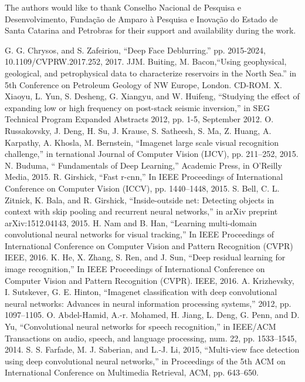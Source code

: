 \documentclass[conference]{IEEEtran}
\begin{document}
The authors would like to thank Conselho
Nacional de Pesquisa e Desenvolvimento, Fundação de
Amparo à Pesquisa e Inovação do Estado de Santa Catarina
and Petrobras for their support and availability during the work.

\begin{thebibliography}{00}

		G. G. Chrysos, and S. Zafeiriou, ``Deep Face Deblurring.'' pp. 2015-2024, 10.1109/CVPRW.2017.252, 2017. 
 		JJM. Buiting, M. Bacon,``Using geophysical, geological, and petrophysical data to characterize reservoirs in the North Sea.'' in 5th Conference on Petroleum Geology of NW Europe, London. CD-ROM.
  		X. Xiaoyu, L. Yun, S. Desheng, G. Xiangyu, and W. Huifeng, ``Studying the effect of expanding low or high frequency on post-stack seismic inversion,'' in SEG Technical Program Expanded Abstracts 2012, pp. 1-5, September 2012.
		O. Russakovsky, J. Deng, H. Su, J. Krause, S. Satheesh, S. Ma, Z. Huang, A. Karpathy, A. Khosla, M. Bernstein, ``Imagenet large scale visual recognition challenge,'' in ternational Journal of Computer Vision (IJCV), pp. 211–252, 2015.
  		N. Buduma, `` Fundamentals of Deep Learning,'' Academic Press, in O'Reilly Media, 2015.
		R. Girshick, ``Fast r-cnn,'' In IEEE Proceedings of International Conference on Computer Vision (ICCV), pp. 1440–1448, 2015.
		S. Bell, C. L. Zitnick, K. Bala, and R. Girshick, ``Inside-outside net: Detecting objects in context with skip pooling and recurrent neural networks,'' in arXiv preprint arXiv:1512.04143, 2015.
			H. Nam and B. Han, ``Learning multi-domain convolutional neural networks for visual tracking,'' In IEEE Proceedings of International Conference on Computer Vision and Pattern Recognition (CVPR) IEEE, 2016.
		K. He, X. Zhang, S. Ren, and J. Sun, ``Deep residual learning for image recognition,'' In IEEE Proceedings of International Conference on Computer Vision and Pattern Recognition (CVPR). IEEE, 2016.
	A. Krizhevsky, I. Sutskever, G. E. Hinton, ``Imagenet classification with deep convolutional neural networks: Advances in neural information processing systems,'' 2012, pp. 1097–1105.
	O. Abdel-Hamid, A.-r. Mohamed, H. Jiang, L. Deng, G. Penn, and D. Yu, ``Convolutional neural networks for speech recognition,'' in IEEE/ACM Transactions on audio, speech, and language processing, num. 22, pp. 1533–1545, 2014.
		S. S. Farfade, M. J. Saberian, and L.-J. Li, 2015, ``Multi-view face detection using deep convolutional neural networks,'' in Proceedings of the 5th ACM on International Conference on Multimedia Retrieval, ACM, pp. 643–650.

\end{thebibliography}
\end{document}
